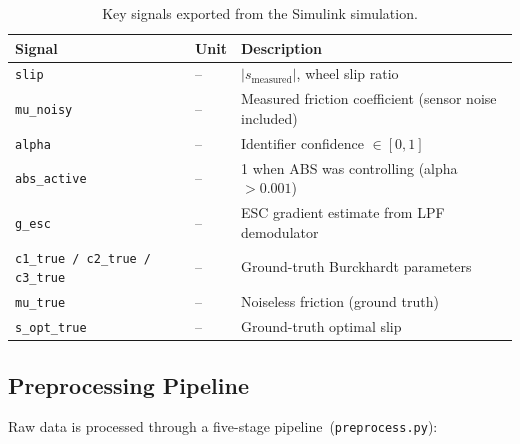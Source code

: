 \documentclass[11pt,a4paper]{article}
\begin{document}
\begin{table}[htbp]
  \centering
  \caption{Key signals exported from the Simulink simulation.}
  \label{tab:signals}
  \begin{tabular}{llp{7cm}}
    \toprule
    Signal & Unit & Description \\
    \midrule
    \texttt{slip} & -- & $|s_\mathrm{measured}|$, wheel slip ratio \\
    \texttt{mu\_noisy} & -- & Measured friction coefficient (sensor noise included) \\
    \texttt{alpha} & -- & Identifier confidence $\in [0,1]$ \\
    \texttt{abs\_active} & -- & 1 when ABS was controlling (alpha $> 0.001$) \\
    \texttt{g\_esc} & -- & ESC gradient estimate from LPF demodulator \\
    \texttt{c1\_true / c2\_true / c3\_true} & -- & Ground-truth Burckhardt parameters \\
    \texttt{mu\_true} & -- & Noiseless friction (ground truth) \\
    \texttt{s\_opt\_true} & -- & Ground-truth optimal slip \\
    \bottomrule
  \end{tabular}
\end{table}

\subsection{Preprocessing Pipeline}

Raw data is processed through a five-stage pipeline~(\texttt{preprocess.py}):
\end{document}
